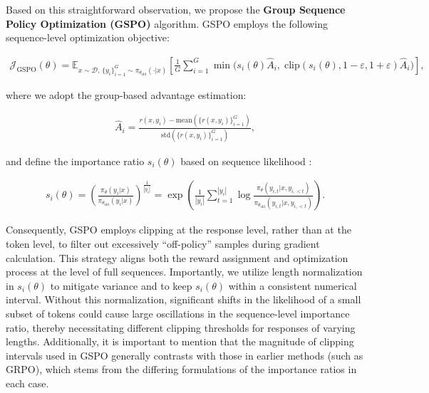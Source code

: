 Based on this straightforward observation, we propose the \textbf{Group Sequence Policy Optimization (GSPO)} algorithm. GSPO employs the following sequence-level optimization objective:

\begin{align}
\mathcal{J}_\text{GSPO} (\theta) =
\mathbb{E}_{ x \sim \mathcal{D},\, \{y_i\}_{i=1}^G \sim \pi_{\theta_\text{old}}( \cdot | x) }
\left[ 
\frac{1}{G} \sum_{i=1}^{G}
\min \bigg( s_{i}(\theta)\widehat{A}_{i},  \; \mathrm{clip}\left( s_{i}(\theta), 1 - {\varepsilon}, 1 + {\varepsilon} \right)\widehat{A}_{i} \bigg)
\right],
\label{equ:gspo}
\end{align}

where we adopt the group-based advantage estimation:

\begin{align}
\widehat{A}_{i} = \frac{r(x, y_i) - \mathrm{mean} \left( \{ r(x, y_i) \}_{i=1}^G \right) }{ \mathrm{std} \left( \{ r(x, y_i) \}_{i=1}^G \right) },
\end{align}

and define the importance ratio $s_{i}(\theta)$ based on sequence likelihood \citep{click}:

\begin{align}
s_{i}(\theta) = \left( \frac{ \pi_{\theta} (y_i | x) }{ \pi_{\theta_\text{old}} (y_i | x)} \right)^{\frac{1}{|y_i|}}
=
\exp \left( \frac{1}{|y_i|} \sum_{t=1}^{|y_i|} \log \frac{ \pi_{\theta} (y_{i,t} | x, y_{i,<t}) }{ \pi_{\theta_\text{old}} (y_{i,t} | x,y_{i,<t})} \right).
\end{align}

Consequently, GSPO employs clipping at the response level, rather than at the token level, to filter out excessively “off-policy” samples during gradient calculation. This strategy aligns both the reward assignment and optimization process at the level of full sequences. Importantly, we utilize length normalization in $s_{i}(\theta)$ to mitigate variance and to keep $s_{i}(\theta)$ within a consistent numerical interval. Without this normalization, significant shifts in the likelihood of a small subset of tokens could cause large oscillations in the sequence-level importance ratio, thereby necessitating different clipping thresholds for responses of varying lengths. Additionally, it is important to mention that the magnitude of clipping intervals used in GSPO generally contrasts with those in earlier methods (such as GRPO), which stems from the differing formulations of the importance ratios in each case.

